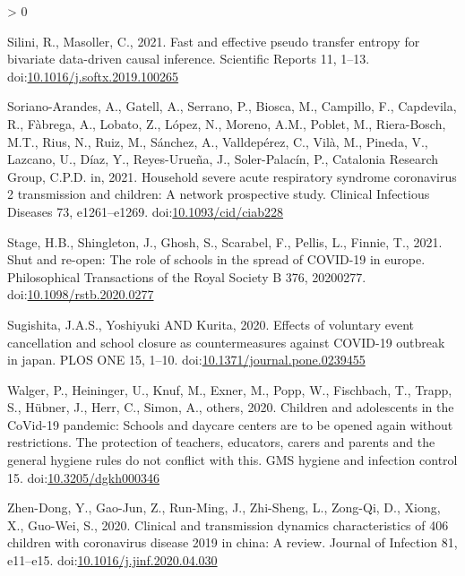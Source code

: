 \documentclass[]{elsarticle} %
\newlength{\cslhangindent}
\newenvironment{CSLReferences}[2] %
 {%
  \setlength{\parindent}{0pt}
  \ifodd #1 \everypar{\setlength{\hangindent}{\cslhangindent}}\ignorespaces\fi
  \ifnum #2 > 0
  \setlength{\parskip}{#2\baselineskip}
  \fi
 }%
 {}
\begin{document}
\begin{CSLReferences}{1}{0}
\leavevmode\hypertarget{ref-silini2021fast}{}%
Silini, R., Masoller, C., 2021. Fast and effective pseudo transfer
entropy for bivariate data-driven causal inference. Scientific Reports
11, 1--13.
doi:\href{https://doi.org/10.1016/j.softx.2019.100265}{10.1016/j.softx.2019.100265}

\leavevmode\hypertarget{ref-sorianoarandes2021household}{}%
Soriano-Arandes, A., Gatell, A., Serrano, P., Biosca, M., Campillo, F.,
Capdevila, R., Fàbrega, A., Lobato, Z., López, N., Moreno, A.M., Poblet,
M., Riera-Bosch, M.T., Rius, N., Ruiz, M., Sánchez, A., Valldepérez, C.,
Vilà, M., Pineda, V., Lazcano, U., Díaz, Y., Reyes-Urueña, J.,
Soler-Palacín, P., Catalonia Research Group, C.P.D. in, 2021. Household
severe acute respiratory syndrome coronavirus 2 transmission and
children: A network prospective study. Clinical Infectious Diseases 73,
e1261--e1269.
doi:\href{https://doi.org/10.1093/cid/ciab228}{10.1093/cid/ciab228}

\leavevmode\hypertarget{ref-stage2021shut}{}%
Stage, H.B., Shingleton, J., Ghosh, S., Scarabel, F., Pellis, L.,
Finnie, T., 2021. Shut and re-open: The role of schools in the spread of
COVID-19 in europe. Philosophical Transactions of the Royal Society B
376, 20200277.
doi:\href{https://doi.org/10.1098/rstb.2020.0277}{10.1098/rstb.2020.0277}

\leavevmode\hypertarget{ref-yoshiyuki2020effects}{}%
Sugishita, J.A.S., Yoshiyuki AND Kurita, 2020. Effects of voluntary
event cancellation and school closure as countermeasures against
COVID-19 outbreak in japan. PLOS ONE 15, 1--10.
doi:\href{https://doi.org/10.1371/journal.pone.0239455}{10.1371/journal.pone.0239455}

\leavevmode\hypertarget{ref-walger2020children}{}%
Walger, P., Heininger, U., Knuf, M., Exner, M., Popp, W., Fischbach, T.,
Trapp, S., Hübner, J., Herr, C., Simon, A., others, 2020. Children and
adolescents in the CoVid-19 pandemic: Schools and daycare centers are to
be opened again without restrictions. The protection of teachers,
educators, carers and parents and the general hygiene rules do not
conflict with this. GMS hygiene and infection control 15.
doi:\href{https://doi.org/10.3205/dgkh000346}{10.3205/dgkh000346}

\leavevmode\hypertarget{ref-zhendong2020clinical}{}%
Zhen-Dong, Y., Gao-Jun, Z., Run-Ming, J., Zhi-Sheng, L., Zong-Qi, D.,
Xiong, X., Guo-Wei, S., 2020. Clinical and transmission dynamics
characteristics of 406 children with coronavirus disease 2019 in china:
A review. Journal of Infection 81, e11--e15.
doi:\href{https://doi.org/10.1016/j.jinf.2020.04.030}{10.1016/j.jinf.2020.04.030}

\end{CSLReferences}
\end{document}
